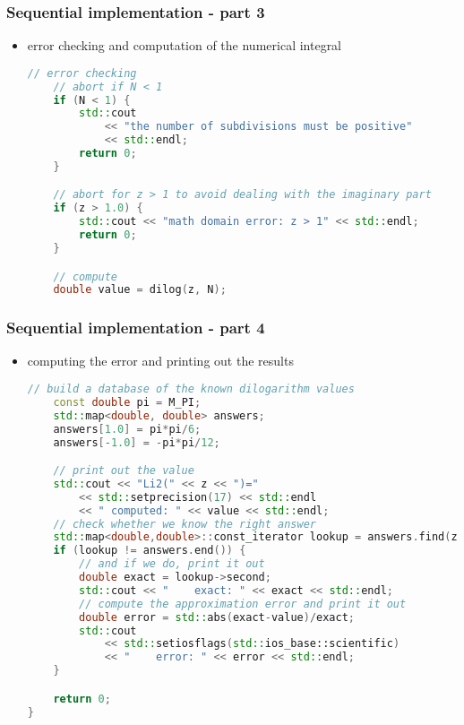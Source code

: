 \begin{frame}[fragile]
%
  \frametitle{Sequential implementation - part 3}
%
  \begin{itemize}
  \item error checking and computation of the numerical integral
  \begin{lstlisting}[language=c++,name=sequential]
    // error checking
    // abort if N < 1
    if (N < 1) {
        std::cout 
            << "the number of subdivisions must be positive"
            << std::endl;
        return 0;
    }

    // abort for z > 1 to avoid dealing with the imaginary part
    if (z > 1.0) {
        std::cout << "math domain error: z > 1" << std::endl;
        return 0;
    } 

    // compute
    double value = dilog(z, N);
  \end{lstlisting}
%
  \end{itemize}
%
\end{frame}

\begin{frame}[fragile]
%
  \frametitle{Sequential implementation - part 4}
%
  \begin{itemize}
  \item computing the error and printing out the results
  \begin{lstlisting}[language=c++,name=sequential]
    // build a database of the known dilogarithm values
    const double pi = M_PI;
    std::map<double, double> answers;
    answers[1.0] = pi*pi/6;
    answers[-1.0] = -pi*pi/12;

    // print out the value
    std::cout << "Li2(" << z << ")="
        << std::setprecision(17) << std::endl
        << " computed: " << value << std::endl;
    // check whether we know the right answer
    std::map<double,double>::const_iterator lookup = answers.find(z);
    if (lookup != answers.end()) {
        // and if we do, print it out
        double exact = lookup->second;
        std::cout << "    exact: " << exact << std::endl;
        // compute the approximation error and print it out
        double error = std::abs(exact-value)/exact;
        std::cout 
            << std::setiosflags(std::ios_base::scientific) 
            << "    error: " << error << std::endl;
    }

    return 0;
}
  \end{lstlisting}
%
  \end{itemize}
%
\end{frame}


